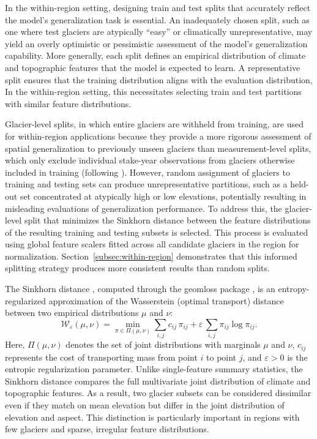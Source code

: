 \documentclass[draft]{agujournal2019}
\begin{document}
In the within-region setting, designing train and test splits that accurately reflect the model's generalization task is essential. An inadequately chosen split, such as one where test glaciers are atypically ``easy'' or climatically unrepresentative, may yield an overly optimistic or pessimistic assessment of the model's generalization capability. More generally, each split defines an empirical distribution of climate and topographic features that the model is expected to learn. A representative split ensures that the training distribution aligns with the evaluation distribution,  In the within-region setting, this necessitates selecting train and test partitions with similar feature distributions. 

Glacier-level splits, in which entire glaciers are withheld from training, are used for within-region applications because they provide a more rigorous assessment of spatial generalization to previously unseen glaciers than measurement-level splits, which only exclude individual stake-year observations from glaciers otherwise included in training (following \citet{Sjursen2025, vanderMeer_2026}). However, random assignment of glaciers to training and testing sets can produce unrepresentative partitions, such as a held-out set concentrated at atypically high or low elevations, potentially resulting in misleading evaluations of generalization performance. To address this, the glacier-level split that minimizes the Sinkhorn distance between the feature distributions of the resulting training and testing subsets is selected. This process is evaluated using global feature scalers fitted across all candidate glaciers in the region for normalization. Section~\ref{subsec:within-region} demonstrates that this informed splitting strategy produces more consistent results than random splits.

The Sinkhorn distance \citep[e.g.,][]{Cuturi_2013}, computed through the geomloss package \citep{feydy2019interpolating}, is an entropy-regularized approximation of the Wasserstein (optimal transport) distance between two empirical distributions $\mu$ and $\nu$:
\begin{equation}
    \mathcal{W}_\varepsilon(\mu, \nu) = \min_{\pi \in \Pi(\mu,\nu)} \sum_{i,j} c_{ij}\,\pi_{ij} + \varepsilon\,\sum_{i,j} \pi_{ij} \log \pi_{ij}.
\end{equation}
Here, $\Pi(\mu,\nu)$ denotes the set of joint distributions with marginals $\mu$ and $\nu$, $c_{ij}$ represents the cost of transporting mass from point $i$ to point $j$, and $\varepsilon > 0$ is the entropic regularization parameter. Unlike single-feature summary statistics, the Sinkhorn distance compares the full multivariate joint distribution of climate and topographic features. As a result, two glacier subsets can be considered dissimilar even if they match on mean elevation but differ in the joint distribution of elevation and aspect. This distinction is particularly important in regions with few glaciers and sparse, irregular feature distributions.
\end{document}
